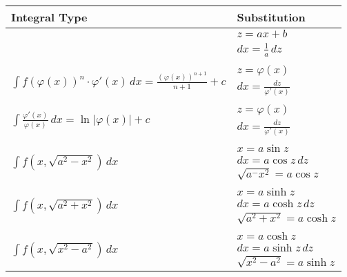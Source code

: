 \bgroup
    \def\arraystretch{1.1}
    \begin{longtable}{ll}
        \toprule
        Integral Type & Substitution \\
        \midrule

        \endhead
        \endfoot
        \endlastfoot

        \multirow{2}{*}{$\int f(ax+b)\,dx = \frac{1}{a}\int f(z)\,dz$} &
        $z=ax+b$ \\* &
        $dx = \frac{1}{a}\,dz$
        \\

        & \\

        \multirow{2}{*}{$\int f(\varphi(x))^n \cdot \varphi'(x)\,dx = \frac{(\varphi(x))^{n+1}}{n+1} + c$} &
        $z=\varphi(x)$ \\* &
        $dx = \frac{dz}{\varphi'(x)}$
        \\

        & \\

        \multirow{2}{*}{$\int \frac{\varphi'(x)}{\varphi(x)}\,dx = \ln|\varphi(x)| + c$} &
        $z=\varphi(x)$ \\* &
        $dx = \frac{dz}{\varphi'(x)}$
        \\

        & \\

        \multirow{3}{*}{$\int f\left(x, \sqrt{a^2-x^2}\right)\,dx$} &
        $x = a\sin{z}$ \\* &
        $dx = a\cos{z}\,dz$ \\* &
        $\sqrt{a^-x^2} = a\cos{z}$
        \\

        & \\

        \multirow{3}{*}{$\int f\left(x, \sqrt{a^2+x^2}\right)\,dx$} &
        $x = a\sinh{z}$ \\* &
        $dx = a\cosh{z}\,dz$ \\* &
        $\sqrt{a^2+x^2} = a\cosh{z}$
        \\

        & \\

        \multirow{3}{*}{$\int f\left(x, \sqrt{x^2-a^2}\right)\,dx$} &
        $x = a\cosh{z}$ \\* &
        $dx = a\sinh{z}\,dz$ \\* &
        $\sqrt{x^2-a^2} = a\sinh{z}$
        \\

        \bottomrule
    \end{longtable}
\egroup


